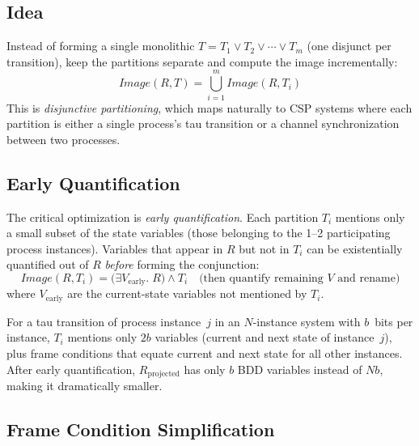 \documentclass[11pt]{article}
\begin{document}
\subsection{Idea}

Instead of forming a single monolithic $T = T_1 \vee T_2 \vee \cdots
\vee T_m$ (one disjunct per transition), keep the partitions separate
and compute the image incrementally:
%
\begin{equation}
\mathit{Image}(R, T) =
  \bigcup_{i=1}^{m} \mathit{Image}(R, T_i)
\label{eq:part-image}
\end{equation}
%
This is \emph{disjunctive partitioning}, which maps naturally to CSP
systems where each partition is either a single process's tau
transition or a channel synchronization between two processes.

\subsection{Early Quantification}

The critical optimization is \emph{early quantification}.  Each
partition $T_i$ mentions only a small subset of the state variables
(those belonging to the 1--2 participating process instances).
Variables that appear in $R$ but not in $T_i$ can be existentially
quantified out of $R$ \emph{before} forming the conjunction:
%
\begin{equation}
\mathit{Image}(R, T_i) =
  \bigl(\exists V_{\mathrm{early}}.\; R\bigr) \wedge T_i
  \quad\text{(then quantify remaining $V$ and rename)}
\end{equation}
%
where $V_{\mathrm{early}}$ are the current-state variables not
mentioned by $T_i$.

For a tau transition of process instance~$j$ in an $N$-instance
system with $b$~bits per instance, $T_i$ mentions only $2b$ variables
(current and next state of instance~$j$), plus frame conditions
that equate current and next state for all other instances.
After early quantification, $R_{\mathrm{projected}}$ has only $b$
BDD variables instead of $Nb$, making it dramatically smaller.

\subsection{Frame Condition Simplification}
\end{document}
